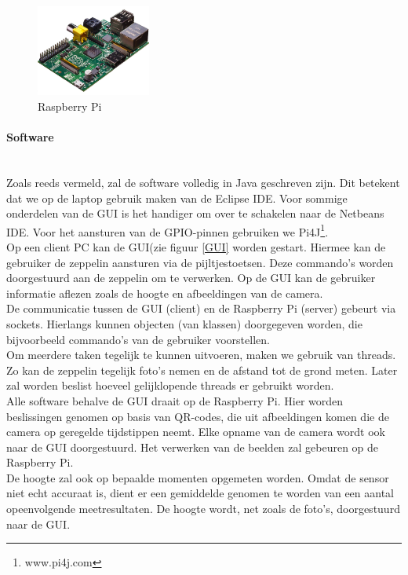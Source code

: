 \documentclass{peno-opdracht2}
\begin{document}
\begin{figure}[ht!]
\centering
\includegraphics[height=30mm]{raspb.jpg}
\caption{Raspberry Pi}
\label{Pi}
\end{figure}

\paragraph{Software} ~\\
Zoals reeds vermeld, zal de software volledig in Java geschreven zijn. Dit betekent dat we op de laptop gebruik maken van de Eclipse IDE. Voor sommige onderdelen van de GUI is het handiger om over te schakelen naar de Netbeans IDE. Voor het aansturen van de GPIO-pinnen gebruiken we Pi4J\footnote{www.pi4j.com}.\\

Op een client PC kan de GUI(zie figuur \ref{GUI} worden gestart. Hiermee kan de gebruiker de zeppelin aansturen via de pijltjestoetsen. Deze commando's worden doorgestuurd aan de zeppelin om te verwerken. Op de GUI kan de gebruiker informatie aflezen zoals de hoogte en afbeeldingen van de camera. \\

De communicatie tussen de GUI (client) en de Raspberry Pi (server) gebeurt via sockets. Hierlangs kunnen objecten (van klassen) doorgegeven worden, die bijvoorbeeld commando's van de gebruiker voorstellen.\\

Om meerdere taken tegelijk te kunnen uitvoeren, maken we gebruik van threads. Zo kan de zeppelin tegelijk foto's nemen en de afstand tot de grond meten. Later zal worden beslist hoeveel gelijklopende threads er gebruikt worden. \\

Alle software behalve de GUI draait op de Raspberry Pi. Hier worden beslissingen genomen op basis van QR-codes, die uit afbeeldingen komen die de camera op geregelde tijdstippen neemt. Elke opname van de camera wordt ook naar de GUI doorgestuurd. Het verwerken van de beelden zal gebeuren op de Raspberry Pi.\\

De hoogte zal ook op bepaalde momenten opgemeten worden. Omdat de sensor niet echt accuraat is, dient er een gemiddelde genomen te worden van een aantal opeenvolgende meetresultaten. De hoogte wordt, net zoals de foto's, doorgestuurd naar de GUI.
\end{document}
